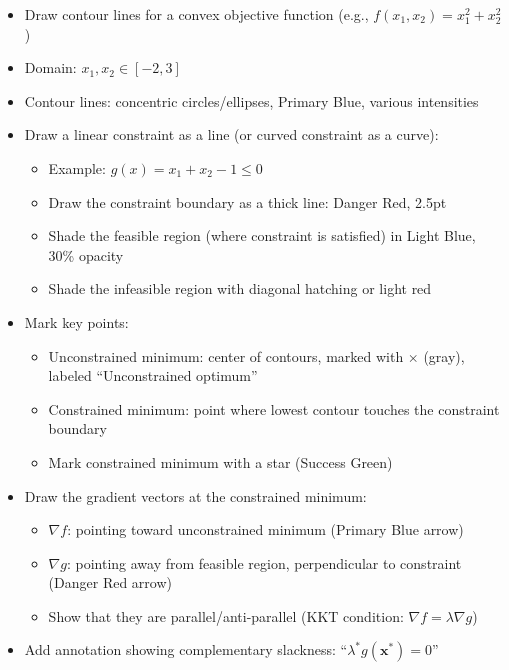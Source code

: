 \documentclass[12pt]{article}
\begin{document}
\begin{description}[style=nextline, leftmargin=0pt]
    \item[Visual Description]
    \begin{itemize}
        \item Draw contour lines for a convex objective function (e.g., $f(x_1, x_2) = x_1^2 + x_2^2$)
        \item Domain: $x_1, x_2 \in [-2, 3]$
        \item Contour lines: concentric circles/ellipses, Primary Blue, various intensities
        \item Draw a linear constraint as a line (or curved constraint as a curve):
        \begin{itemize}
            \item Example: $g(x) = x_1 + x_2 - 1 \leq 0$
            \item Draw the constraint boundary as a thick line: Danger Red, 2.5pt
            \item Shade the feasible region (where constraint is satisfied) in Light Blue, 30\% opacity
            \item Shade the infeasible region with diagonal hatching or light red
        \end{itemize}
        \item Mark key points:
        \begin{itemize}
            \item Unconstrained minimum: center of contours, marked with $\times$ (gray), labeled ``Unconstrained optimum''
            \item Constrained minimum: point where lowest contour touches the constraint boundary
            \item Mark constrained minimum with a star (Success Green)
        \end{itemize}
        \item Draw the gradient vectors at the constrained minimum:
        \begin{itemize}
            \item $\nabla f$: pointing toward unconstrained minimum (Primary Blue arrow)
            \item $\nabla g$: pointing away from feasible region, perpendicular to constraint (Danger Red arrow)
            \item Show that they are parallel/anti-parallel (KKT condition: $\nabla f = \lambda \nabla g$)
        \end{itemize}
        \item Add annotation showing complementary slackness: ``$\lambda^* g(\mathbf{x}^*) = 0$''
    \end{itemize}


\end{description}
\end{document}
